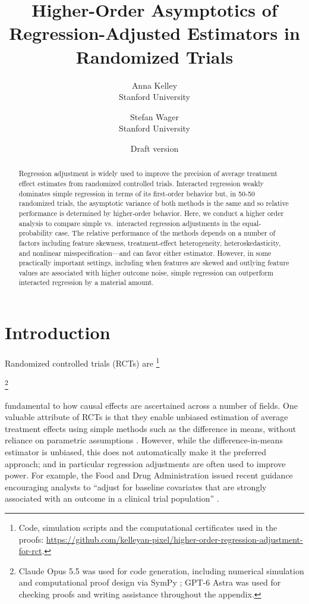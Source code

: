 \documentclass{article}
\author{Anna Kelley \\ Stanford University \and Stefan Wager \\ Stanford University}
\date{Draft version \monthyear}
\title{Higher-Order Asymptotics of \\ Regression-Adjusted Estimators in Randomized Trials}
\theoremstyle{plain}
\theoremstyle{definition}
\theoremstyle{remark}
\newcommand\blfootnote[1]{%
  \begingroup
  \renewcommand\thefootnote{}%
  \footnote{#1}%
  \addtocounter{footnote}{-1}%
  \endgroup
}
\begin{document}
\maketitle

\begin{abstract}
Regression adjustment is widely used to improve the precision of average treatment effect estimates from randomized controlled trials. Interacted regression weakly dominates simple regression in terms of its first-order behavior but, in 50-50 randomized trials, the asymptotic variance of both methods is the same and so relative performance is determined by higher-order behavior. Here, we conduct a higher order analysis to compare simple vs.~interacted regression adjustments in the equal-probability case. The relative performance of the methods depends on a number of factors including feature skewness, treatment-effect heterogeneity, heteroskedasticity, and nonlinear misspecification---and can favor either estimator. However, in some practically important settings, including when features are skewed and outlying feature values are associated with higher outcome noise, simple regression can outperform interacted regression by a material amount.
\end{abstract}

\section{Introduction}

Randomized controlled trials (RCTs) are\blfootnote{\hspace{-5.5mm}Code, simulation scripts and the computational certificates used in the proofs: \url{https://github.com/kelleyan-pixel/higher-order-regression-adjustment-for-rct}.} 
\blfootnote{\hspace{-5.5mm} Claude Opus 5.5 was used for code generation, including numerical simulation and computational proof design via SymPy \citep{sympy}; GPT-6 Astra was used for checking proofs and writing assistance throughout the appendix. }

fundamental to how causal effects are ascertained across a number of fields. One valuable attribute of RCTs is that they enable unbiased estimation of average treatment effects using simple methods such as the difference in means, without reliance on parametric assumptions \citep{imbens2015causal}. However, while the difference-in-means estimator is unbiased, this does not automatically make it the preferred approach; and in particular regression adjustments are often used to improve power. For example, the Food and Drug Administration issued recent guidance encouraging analysts to ``adjust for baseline covariates that are strongly associated with an outcome in a clinical trial population'' \citep[accompanying guidance snapshot]{FDA2023}.
\end{document}
